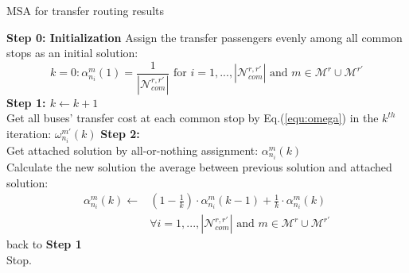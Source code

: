 \documentclass[smallextended]{svjour3}       %
\begin{document}
\begin{Abstract}
\begin{algorithm}[H]
    \caption{MSA for transfer routing results}
    \label{MSA}
    \begin{algorithmic}
    \STATE \textbf{Step 0: Initialization}
    \STATE Assign the transfer passengers evenly among all common stops as an initial solution:\\
    \begin{equation}
        k=0: \alpha_{n_{i}}^{m}(1)=\frac{1}{\left|\mathcal{N}_{com}^{r,r'}\right|} \text{ for } i=1,...,\left|\mathcal{N}_{com}^{r,r'}\right|
        \text{ and } m\in \mathcal{M}^{r}\cup\mathcal{M}^{r'}
    \end{equation}
    \STATE \textbf{Step 1: $k\leftarrow k+1$ }\\
    \STATE Get all buses' transfer cost at each common stop by \textup{Eq.(\ref{equ:omega})} in the $k^{th}$ iteration: $\omega_{n_{i}}^{m'}(k)$
    \STATE \textbf{Step 2:}\\
    Get attached solution by all-or-nothing assignment: $\alpha_{n_{i}}^{m}(k)$ \\
    Calculate the new solution the average between previous solution and attached solution:\\
    \begin{equation}
        \begin{split}
            \alpha_{n_{i}}^{m}(k) \leftarrow 
            &\left(1-\frac{1}{k}\right) \cdot \alpha_{n_{i}}^{m}\left(k-1\right) + \frac{1}{k} \cdot \alpha_{n_{i}}^{m}\left( k \right)\\
            &\forall i=1,...,\left|\mathcal{N}_{com}^{r,r'}\right| \text{ and } m\in \mathcal{M}^{r}\cup\mathcal{M}^{r'}
        \end{split}
    \end{equation}
    \STATE back to \textbf{Step 1}\\
    \ELSE 
    \STATE Stop.
    \ENDIF
    \end{algorithmic}
\end{algorithm}


\end{Abstract}
\end{document}
